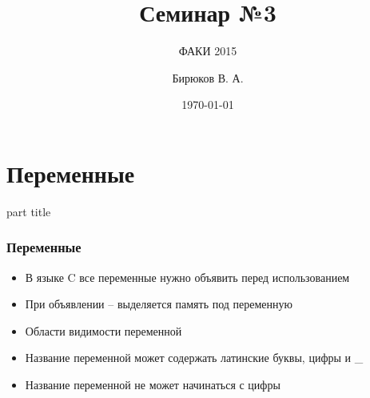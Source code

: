 \documentclass[14pt,pdf,hyperref={unicode}]{beamer}
\title{Семинар №3}
\subtitle{ФАКИ 2015}
\author{Бирюков В. А.}
\date{\today}
\begin{document}
\lstset{language=C}

\begin{frame}
\titlepage
\end{frame} 







\section{Переменные}
\begin{frame}
\begin{center}
\begin{beamercolorbox}[sep=8pt,center]{part
title}
\insertsection
\end{beamercolorbox}
\end{center}
\end{frame}



\begin{frame}
\frametitle{Переменные} 
\begin{center}
\begin{itemize}
\item В языке C все переменные нужно объявить перед использованием
\item При объявлении -- выделяется память под переменную
\item Области видимости переменной
\item Название переменной может содержать латинские буквы, цифры и \_
\item Название переменной не может начинаться с цифры
\end{itemize}
\end{center}
\end{frame}
\end{document}
